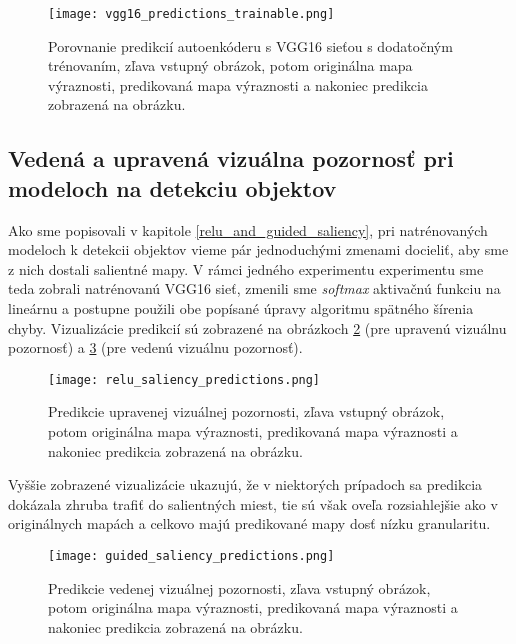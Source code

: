 \begin{figure}[H]
	\begin{center}
		\texttt{[image: vgg16\_predictions\_trainable.png]}
		\caption[Porovnanie predikcií autoenkóderu s VGG16 sieťou s dodatočným trénovaním voči reálnym mapám výraznosti]{
			Porovnanie predikcií autoenkóderu s VGG16 sieťou s dodatočným trénovaním, zľava vstupný obrázok, potom originálna mapa výraznosti, predikovaná mapa výraznosti a nakoniec predikcia zobrazená na obrázku.
		}\label{vgg_predictions_trainable}
	\end{center}
\end{figure}

\subsection{Vedená a upravená vizuálna pozornosť pri modeloch na detekciu objektov}

Ako sme popisovali v kapitole \ref{relu_and_guided_saliency}, pri natrénovaných modeloch k detekcii objektov vieme pár jednoduchými zmenami docieliť, aby sme z nich dostali salientné mapy. V rámci jedného experimentu experimentu sme teda zobrali natrénovanú VGG16 sieť, zmenili sme \textit{softmax} aktivačnú funkciu na lineárnu a postupne použili obe popísané úpravy algoritmu spätného šírenia chyby. Vizualizácie predikcií sú zobrazené na obrázkoch \ref{relu_saliency_predictions} (pre upravenú vizuálnu pozornosť) a \ref{guided_saliency_predictions} (pre vedenú vizuálnu pozornosť). 

\begin{figure}[H]
	\begin{center}
		\texttt{[image: relu\_saliency\_predictions.png]}
		\caption[Porovnanie predikcií upravenej vizuálnej pozornosti voči reálnym mapám výraznosti]{
			Predikcie upravenej vizuálnej pozornosti, zľava vstupný obrázok, potom originálna mapa výraznosti, predikovaná mapa výraznosti a nakoniec predikcia zobrazená na obrázku.
		}\label{relu_saliency_predictions}
	\end{center}
\end{figure}

Vyššie zobrazené vizualizácie ukazujú, že v niektorých prípadoch sa predikcia dokázala zhruba trafiť do salientných miest, tie sú však oveľa rozsiahlejšie ako v originálnych mapách a celkovo majú predikované mapy dosť nízku granularitu. 

\begin{figure}[H]
	\begin{center}
		\texttt{[image: guided\_saliency\_predictions.png]}
		\caption[Porovnanie predikcií vedenej vizuálnej pozornosti voči reálnym mapám výraznosti]{
			Predikcie vedenej vizuálnej pozornosti, zľava vstupný obrázok, potom originálna mapa výraznosti, predikovaná mapa výraznosti a nakoniec predikcia zobrazená na obrázku.
		}\label{guided_saliency_predictions}
	\end{center}
\end{figure}

